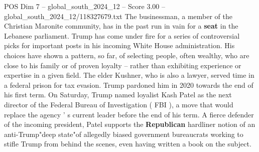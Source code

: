 \begin{textsample}{POS Dim 7 – global\_south\_2024\_12 – Score 3.00 – global\_south\_2024\_12/118327679.txt}
The businessman, a member of the Christian Maronite community, has in the past run in vain for a \textbf{seat} in the Lebanese parliament.
Trump has come under fire for a series of controversial picks for important posts in his incoming White House administration.
His choices have shown a pattern, so far, of selecting people, often wealthy, who are close to his family or of proven loyalty -- rather than exhibiting experience or expertise in a given field.
The elder Kushner, who is also a lawyer, served time in a federal prison for tax evasion.
Trump pardoned him in 2020 towards the end of his first term.
On Saturday, Trump named loyalist Kash Patel as the next director of the Federal Bureau of Investigation ( FBI ), a move that would replace the agency ' s current leader before the end of his term.
A fierce defender of the incoming president, Patel supports the \textbf{Republican} hardliner notion of an anti-Trump"deep state"of allegedly biased government bureaucrats working to stifle Trump from behind the scenes, even having written a book on the subject.

\end{textsample}
